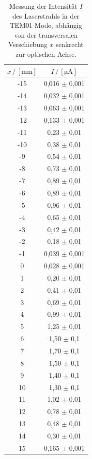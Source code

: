 \begin{table}[H]
    
    \centering
    \caption{Messung der Intensität $I$ des Laserstrahls in der TEM01 Mode, abhängig von der transversalen Verschiebung $x$ senkrecht zur optischen Achse.}
    \begin{tabular}{cc}
    \toprule
    $x \,/\, [\unit{\milli\meter}]$ &
    $I \,/\, [\unit{\micro\ampere}]$\\
    \midrule
    -15 & 0,016 $\pm$  0,001 \\
    -14 & 0,032 $\pm$  0,001 \\
    -13 & 0,063 $\pm$  0,001 \\
    -12 & 0,133 $\pm$  0,001 \\
    -11 & 0,23  $\pm$  0,01  \\ 
    -10 & 0,38  $\pm$  0,01  \\ 
    -9  & 0,54  $\pm$  0,01  \\ 
    -8  & 0,73  $\pm$  0,01  \\ 
    -7  & 0,89  $\pm$  0,01  \\ 
    -6  & 0,89  $\pm$  0,01  \\ 
    -5  & 0,96  $\pm$  0,01  \\ 
    -4  & 0,65  $\pm$  0,01  \\ 
    -3  & 0,42  $\pm$  0,01  \\ 
    -2  & 0,18  $\pm$  0,01  \\ 
    -1  & 0,039 $\pm$  0,001 \\  
    0   & 0,028 $\pm$  0,001 \\  
    1   & 0,20  $\pm$  0,01  \\  
    2   & 0,41  $\pm$  0,01  \\  
    3   & 0,69  $\pm$  0,01  \\  
    4   & 0,99  $\pm$  0,01  \\  
    5   & 1,25  $\pm$  0,01  \\  
    6   & 1,50  $\pm$  0,1   \\   
    7   & 1,70  $\pm$  0,1   \\   
    8   & 1,50  $\pm$  0,1   \\   
    9   & 1,40  $\pm$  0,1   \\   
    10  & 1,30  $\pm$  0,1   \\   
    11  & 1,02  $\pm$  0,01  \\     
    12  & 0,78  $\pm$  0,01  \\     
    13  & 0,48  $\pm$  0,01  \\     
    14  & 0,30  $\pm$  0,01  \\     
    15  & 0,165 $\pm$  0,001 \\
    \bottomrule
    \end{tabular}
    \label{tab:tem01}
\end{table}



